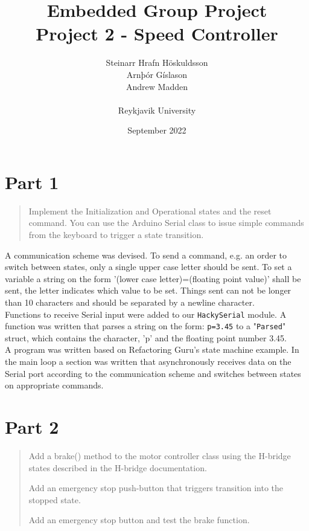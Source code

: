 \documentclass{article}
\title{Embedded Group Project\\ \large Project 2 - Speed Controller}
\author{Steinarr Hrafn Höskuldsson\\
Arnþór Gíslason\\
Andrew Madden\\
\\
Reykjavik University}
\date{September 2022}
\newcommand{\mycomment}[1]{}
\begin{document}
\maketitle
\mycomment{
\begin{figure}[h]
    \centering
    \texttt{[image: LAB3/Basic1.png]}
    \caption{"Switch test" Breadboard set up}
    \label{fig:Switch_test}
\end{figure}



}

\section{Part 1}
\begin{quote}
    
Implement the Initialization and Operational states and the reset command.  You can use the Arduino Serial class to issue simple commands from the keyboard to trigger a state transition.
\end{quote}

A communication scheme was devised. To send a command, e.g. an order to switch between states, only a single upper case letter should be sent. To set a variable a string on the form '(lower case letter)=(floating point value)' shall be sent, the letter indicates which value to be set. Things sent can not be longer than 10 characters and should be separated by a newline character.
\\
Functions to receive Serial input were added to our \verb!HackySerial! module. A function was written that parses a string on the form: \verb!p=3.45! to a "\verb!Parsed!" struct, which contains the character, 'p' and the floating point number 3.45.
\\
A program was written based on Refactoring Guru's state machine example. In the main loop a section was written that asynchronously receives data on the Serial port according to the communication scheme and switches between states on appropriate commands.

\section{Part 2}

\begin{quote}
    
Add a brake() method to the motor controller class using the H-bridge states described in the H-bridge documentation.

Add an emergency stop push-button that triggers transition into the stopped state.

    Add an emergency stop button and test the brake function.
\end{quote}
\end{document}
